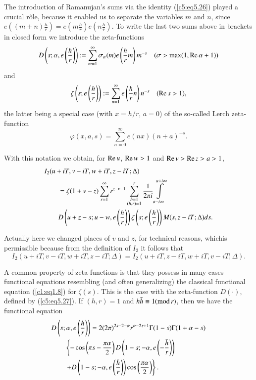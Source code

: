 The introduction of Ramanujan's sums via the identity
(\ref{c5:eq5.26}) played a crucial r\^ole, because it enabled us to
separate the variables $m$ and $n$, since $e \left((m+n) \frac{h}{r}
\right) = e \left(m \frac{h}{r} \right) e \left(n \frac{h}{r}
\right)$. To write the last two sums above in brackets in closed form
we introduce the zeta-functions 
{\fontsize{10pt}{12pt}\selectfont
\begin{equation}
D \left(s; \alpha, e \left(\frac{h}{r} \right) \right) : =
\sum\limits^\infty_{m=1} \sigma_\alpha(m) e \left(\frac{h}{r}m \right)
m^{-s} \quad (\sigma > \max (1, \operatorname{Re} \alpha+1))\label{c5:eq5.27} 
\end{equation}}
and 
\begin{equation}
\zeta \left(s; e \left(\frac{h}{r} \right) \right) : =
\sum\limits^\infty_{n=1} e \left(\frac{h}{r}n \right) n^{-s} \quad
(\operatorname{Re} s >1),\label{c5:eq5.28} 
\end{equation}
the latter being a special case (with $x = h / r$, $a=0$) of the
so-called Lerch zeta-function 
\begin{equation}
\varphi (x, a,s) = \sum\limits^\infty_{n=0} e (nx)
(n+a)^{-s}.\label{c5:eq5.29} 
\end{equation}

With this notation we obtain, for $\operatorname{Re} u$, $\operatorname{Re} w >1$ and $\operatorname{Re} v > \operatorname{Re}
z > a >1$,  
\begin{align}
& I_2 (u+iT, v - i T, w + iT, z - iT;\Delta)\label{c5:eq5.30}\\
& \qquad = \zeta (1+v-z) \sum\limits^\infty_{r=1} r^{z-v-1}
  \sum\limits^r_{\substack{h=1\\(h,r)=1}} \frac{1}{2\pi i}
  \int\limits^{a+i\infty}_{a - i\infty}\notag\\ 
& \qquad D \left(u+z-s; u-w, e \left(\frac{h}{r} \right) \right) \zeta
  \left(s; e \left(\frac{h}{r} \right) \right) M (s, z - iT;\Delta)
  ds. \notag 
\end{align}

Actually here we changed places of $v$ and $z$, for technical reasons,
which\pageoriginale is permissible because from the definition of
$I_2$ it follows that  
$$
I_2 (u+iT, v - iT, w + iT, z - iT;\Delta) = I_2 (u+iT, z - iT, w+iT, v
-iT;\Delta). 
$$

A common property of zeta-functions is that they possess in many cases
functional equations resembling (and often generalizing) the classical
functional equation (\ref{c1:eq1.8}) for $\zeta(s)$. This is the case
with the zeta-function $D(\cdot)$, defined by (\ref{c5:eq5.27}). If
$(h,r) =1$ and $h \bar{h} \equiv 1 (\text{mod\,} r)$, then we have the
functional equation 
\begin{align}
& D \left(s;\alpha, e \left(\frac{h}{r} \right) \right)  =  
2(2\pi)^{2s-2-\alpha} r^{\alpha-2s+1} \Gamma(1-s) \Gamma (1+\alpha-s)
\label{c5:eq5.31}\\ 
& \qquad \left\{- \cos \left(\pi s - \frac{\pi \alpha}{2} \right)  D
\left(1-s ; -\alpha,e \left(-\frac{\bar{h}}{r} \right) \right)
\right.\notag\\ 
& \qquad   \left. + D \left(1-s; -\alpha, e \left(\frac{\bar{h}}{r}
\right) \right) \cos \left(\frac{\pi \alpha}{2} \right)
\right\}.\notag 
\end{align}

